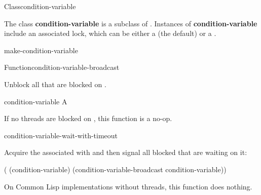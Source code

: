 
\begin{functiondoc}{Class}{condition-variable}{}
%
  
\fnsyntax

\fnpackage {}

\fnmodule {}

\fndescription The class \textbf{condition-variable} is a subclass of
.  Instances of \textbf{condition-variable} include an
associated lock, which can be either a  (the default) or a
.

\begin{alsos}{make-condition-variable}
\end{alsos}

\end{functiondoc}


\begin{functiondoc}{Function}{condition-variable-broadcast}%
  {}
%

\fnsyntax

\fnpurpose Unblock all  that are blocked on .

\fnpackage {}

\fnmodule {}

\fnargs
\begin{args}{condition-variable}
 A 
\end{args}

\fnerrors
\nocvlock{}

\fndescription If no threads are blocked on , this
function is a no-op.

\begin{alsos}{condition-variable-wait-with-timeout}
\end{alsos}

%
\fnexample Acquire the  associated with 
and then signal all blocked  that are waiting on it:
\begin{example}
  ( (condition-variable)
    (condition-variable-broadcast condition-variable))
\end{example}

\fnnote On Common Lisp implementations without threads, this function does
nothing.

\end{functiondoc}

